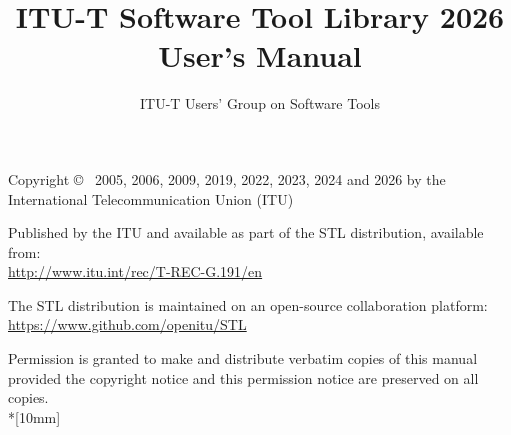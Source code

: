 \documentclass[12pt,a4paper]{book}
\begin{document}
\SF

\def\sixsf{\footnotesize\tt}
\def\tenrm{\small\tt}
\def\twlsf{\sf}


\title{ITU-T Software Tool Library 2026 User's Manual}
\author{ITU-T Users' Group on Software Tools}

\maketitle
\thispagestyle{empty}


 Copyright \copyright~ 2005, 2006, 2009, 2019, 2022, 2023, 2024 and 2026 by the International
 Telecommunication Union (ITU)



Published by the ITU and available as part of the STL distribution, available from: \\
\url{http://www.itu.int/rec/T-REC-G.191/en}

The STL distribution is maintained on an open-source collaboration platform:\\
\url{https://www.github.com/openitu/STL}

Permission is granted to make and distribute verbatim copies of this manual provided the copyright notice and this permission notice are preserved on all copies.\\*[10mm]

\tableofcontents

\def\long{{\tt long}}

\cleardoublepage
{}
\setcounter{page}{1}



\end{document}
